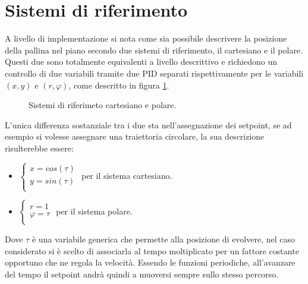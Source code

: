 \documentclass[12pt,twoside,openright]{report}
\begin{document}
\section{Sistemi di riferimento}\label{sistemidiriferimento}
A livello di implementazione si nota come sia possibile descrivere la posizione della pallina nel piano secondo due sistemi di riferimento, il cartesiano e il polare. Questi due sono totalmente equivalenti a livello descrittivo e richiedono un controllo di due variabili tramite due PID separati rispettivamente per le variabili $(x,y)$ e $(r,\varphi)$, come descritto in figura \ref{fig:sistemiriferimento}.
\begin{figure}[h!]
\centering
{}
\caption{Sistemi di riferimeto cartesiano e polare.} \label{fig:sistemiriferimento}
\end{figure}
L'unica differenza sostanziale tra i due sta nell'assegnazione dei setpoint, se ad esempio si volesse assegnare una traiettoria circolare, la sua descrizione risulterebbe essere:
\begin{itemize}
\item
    $\begin{cases}
      x=cos(\tau)\\
      y=sin(\tau)\\
    \end{cases}$
 per il sistema cartesiano.
\item $\begin{cases}
      r=1\\
      \varphi=\tau\\
    \end{cases}$ per il sistema polare.
\end{itemize}
Dove $\tau$ è una variabile generica che permette alla posizione di evolvere, nel caso considerato si è scelto di associarla al tempo moltiplicato per un fattore costante opportuno che ne regola la velocità. Essendo le funzioni periodiche, all'avanzare del tempo il setpoint andrà quindi a muoversi sempre sullo stesso percorso.
\end{document}
